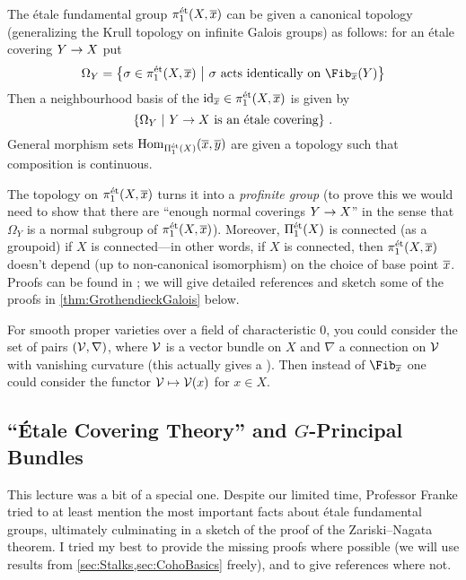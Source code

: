 \begin{rem}
	 The étale fundamental group $\pi_1^\et(X,\ov{x})$ can be given a canonical topology (generalizing the Krull topology on infinite Galois groups) as follows: for an étale covering $Y\morphism X$ put
	\begin{equation*}
	\Omega_Y=\left\{\sigma\in\pi_1^\et(X,\ov{x})\st\sigma\text{ acts identically on }\Fib_{\ov{x}}(Y)\right\}
	\end{equation*}
	Then a neighbourhood basis of the $\id_{\ov{x}}\in\pi_1^\et(X,\ov{x})$ is given by
	\begin{equation*}
	\left\{\Omega_Y\ \middle|\  Y\rightarrow X\text{ is an étale covering}\right\}\,.
	\end{equation*}
	General morphism sets $\Hom_{\Pi_1^\et(X)}(\ov{x},\ov{y})$ are given a topology such that composition is continuous.
	
	The topology on $\pi_1^\et(X,\ov{x})$ turns it into a \emph{profinite group} (to prove this we would need to show that there are \enquote{enough normal coverings $Y\morphism X$} in the sense that $\Omega_Y$ is a normal subgroup of $\pi_1^\et(X,\ov{x})$). Moreover, $\Pi_1^{\mathrm{\acute{e}t}}(X)$ is connected (as a groupoid) if $X$ is connected---in other words, if $X$ is connected, then $\pi_1^\et(X,\ov{x})$ doesn't depend (up to non-canonical isomorphism) on the choice of base point $\ov{x}$. Proofs can be found in \cite[Exposé~V]{sga1}; we will give detailed references and sketch some of the proofs in \cref{thm:GrothendieckGalois} below.
\end{rem}
\begin{rem}
	For smooth proper varieties over a field of characteristic $0$, you could consider the set of pairs $(\mathcal{V},\nabla)$, where $\mathcal{V}$ is a vector bundle on $X$ and $\nabla$ a connection on $\mathcal{V}$ with vanishing curvature (this actually gives a ). Then instead of $\Fib_{\ov{x}}$ one could consider the functor $\mathcal{V}\mapsto\mathcal{V}(x)$ for $x\in X$.
\end{rem}
\subsection{\enquote{Étale Covering Theory} and \texorpdfstring{$G$}{G}-Principal Bundles}
This lecture was a bit of a special one. Despite our limited time, Professor Franke tried to at least mention the most important facts about étale fundamental groups, ultimately culminating in a sketch of the proof of the Zariski--Nagata theorem. I tried my best to provide the missing proofs where possible (we will use results from \cref{sec:Stalks,sec:CohoBasics} freely), and to give references where not. 

